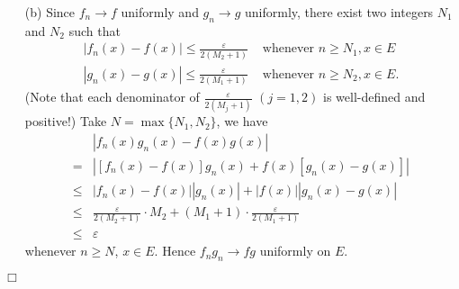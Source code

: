 \documentclass{article}
\begin{document}
\begin{enumerate}
\begin{enumerate}
    \item[(b)]
    Since $f_n \to f$ uniformly and $g_n \to g$ uniformly,
    there exist two integers $N_1$ and $N_2$ such that
    \begin{align*}
      |f_n(x) - f(x)| \leq \frac{\varepsilon}{2(M_2 + 1)}
      &\text{ whenever }
      n \geq N_1, x \in E \\
      |g_n(x) - g(x)| \leq \frac{\varepsilon}{2(M_1 + 1)}
      &\text{ whenever }
      n \geq N_2, x \in E.
    \end{align*}
    (Note that each denominator of $\frac{\varepsilon}{2(M_j + 1)}$ $(j=1,2)$
    is well-defined and positive!)
    Take $N = \max\{N_1,N_2\}$, we have
    \begin{align*}
      &|f_n(x)g_n(x) - f(x)g(x)| \\
      =& |[f_n(x) - f(x)]g_n(x) + f(x)[g_n(x) - g(x)]| \\
      \leq& |f_n(x) - f(x)||g_n(x)| + |f(x)||g_n(x) - g(x)| \\
      \leq& \frac{\varepsilon}{2(M_2 + 1)} \cdot M_2
        + (M_1 + 1) \cdot \frac{\varepsilon}{2(M_1 + 1)} \\
      \leq& \varepsilon
    \end{align*}
    whenever $n \geq N$, $x \in E$.
    Hence $f_n g_n \to fg$ uniformly on $E$.
  \end{enumerate}
\end{enumerate}
$\Box$ \\
\end{document}
